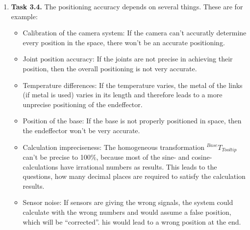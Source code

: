 \documentclass[a4paper,11pt]{article}
\begin{document}
\begin {enumerate}
\begin{enumerate}
        \item[3)] 



        \item[4)]
    \end{enumerate}

\item[\textbf{Task 3.4.}] The positioning accuracy depends on several things. These are for example:

\begin{itemize}
  \item Calibration of the camera system: If the camera can't accuratly determine every position in the space, there won't be an accurate positioning.
  \item Joint position accuracy: If the joints are not precise in achieving their position, then the overall positioning is not very accurate.
  \item Temperature differences: If the temperature varies, the metal of the links (if metal is used) varies in its length and therefore leads to a more unprecise positioning of the endeffector.
  \item Position of the base: If the base is not properly positioned in space, then the endeffector won't be very accurate.
  \item Calculation impreciseness: The homogeneous transformation ${^{Base}T_{Tooltip}}$ can't be precise to 100\%, because most of the sine- and cosine-calculations have irrational numbers as results. This leads to the questions, how many decimal places are required to satisfy the calculation results.
  \item Sensor noise: If sensors are giving the wrong signals, the system could calculate with the wrong numbers and would assume a false position, which will be ``corrected''. his would lead to a wrong position at the end.
\end{itemize}

\end {enumerate}
\end{document}
